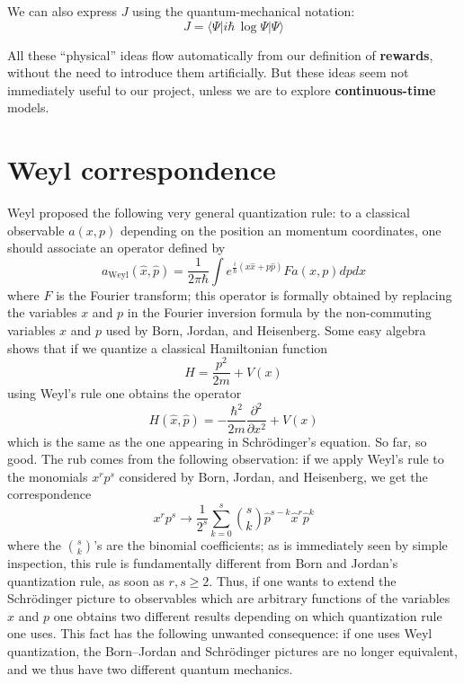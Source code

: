 \documentclass[orivec]{llncs}
\begin{document}
We can also express $J$ using the quantum-mechanical notation:
\begin{equation}
J = \langle \Psi | i \hbar \,\log \Psi | \Psi \rangle
\end{equation}

All these ``physical'' ideas flow automatically from our definition of \textbf{rewards}, without the need to introduce them artificially.  But these ideas seem not immediately useful to our project, unless we are to explore \textbf{continuous-time} models.

\section{Weyl correspondence}

Weyl proposed the following very general quantization rule: to a classical observable $a(x, p)$ depending on the position an momentum coordinates, one should associate an operator defined by
\begin{equation}
a_{\text{Weyl}} (\hat{x}, \hat{p}) = \frac{1}{2 \pi \hbar} \int e^{\frac{i}{\hbar} (x \hat{x} + p \hat{p})}  F a(x, p) dp dx
\end{equation}
where $F$ is the Fourier transform; this operator is formally obtained by replacing the variables $x$ and $p$ in the Fourier inversion formula by the non-commuting variables $x$ and $p$ used by Born, Jordan, and Heisenberg. Some easy algebra shows that if we quantize a classical Hamiltonian function
\begin{equation}
H = \frac{p^2}{2m} + V(x)
\end{equation}
using Weyl’s rule one obtains the operator
\begin{equation}
H(\hat{x}, \hat{p}) = - \frac{\hbar^2}{2m} \frac{\partial^2}{\partial x^2} + V(x)
\end{equation}
which is the same as the one appearing in Schrödinger’s equation. So far, so good. The rub comes from the following observation: if we apply Weyl’s rule to the monomials $x^r p^s$ considered by Born, Jordan, and Heisenberg, we get the correspondence
\begin{equation}
x^r p^s \longrightarrow \frac{1}{2^s} \sum_{k=0}^{s} {s \choose k} \hat{p}^{s-k} \hat{x}^r \hat{p}^k
\end{equation}
where the ${s \choose k}$'s are the binomial coefficients; as is immediately seen by simple inspection, this rule is fundamentally different from Born and Jordan’s quantization rule, as soon as $r, s \ge 2$. Thus, if one wants to extend the Schr\"{o}dinger picture to observables which are arbitrary functions of the variables $x$ and $p$ one obtains two different results depending on which quantization rule one uses. This fact has the following unwanted consequence: if one uses Weyl quantization, the Born–Jordan and Schr\"{o}dinger pictures are no longer equivalent, and we thus have two different quantum mechanics.
\end{document}
